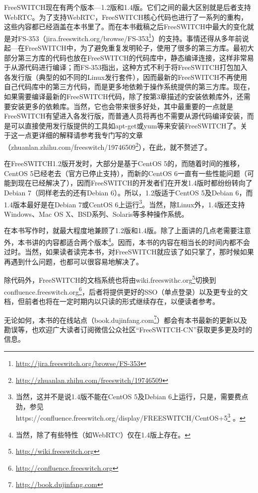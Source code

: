 \documentclass[$if(fontsize)$$fontsize$,$endif$$if(lang)$$lang$,$endif$CJKutf8]{$documentclass$}
\renewcommand{\href}[2]{#2\footnote{\url{#1}}}
\begin{document}
FreeSWITCH现在有两个版本---1.2版和1.4版。它们之间的最大区别就是后者支持WebRTC。为了支持WebRTC，FreeSWITCH核心代码也进行了一系列的重构，这些内容都已经涵盖在本书里了。而在本书截稿之后FreeSWITCH中最大的变化就是对FS-353（\href{http://jira.freeswitch.org/browse/FS-353}{jira.freeswitch.org/browse/FS-353}）的支持。事情还得从多年前说起---在FreeSWITCH中，为了避免重复发明轮子，使用了很多的第三方库。最初大部分第三方库的代码也放在FreeSWITCH的代码库中，静态编译连接，这样非常易于从源代码进行编译；而FS-353指出，这种方式不利于将FreeSWITCH打包加入各发行版（典型的如不同的Linux发行套件），因而最新的FreeSWITCH不再使用自己代码库中的第三方代码，而是更多地依赖于操作系统提供的第三方库。现在，如果需要编译最新的FreeSWITCH代码，除了按第3章描述的安装依赖库外，还需要安装更多的依赖库。当然，它也会带来很多好处，其中最重要的一点就是FreeSWITCH有望进入各发行版，而普通人员将再也不需要从源代码编译安装，而是可以直接使用发行版提供的工具如apt-get或yum等来安装FreeSWITCH了。关于这一点更详细的解释请参考我专门写的文章（\href{http://zhuanlan.zhihu.com/freeswitch/19746509}{zhuanlan.zhihu.com/freeswitch/19746509}），在此，就不赘述了。

在FreeSWITCH1.2版开发时，大部分是基于CentOS 5的，而随着时间的推移，CentOS 5已经老去（官方已停止支持），而新的CentOS 6一直有一些性能问题（可能到现在已经解决了），因而FreeSWITCH的开发者们在开发1.4版时都纷纷转向了Debian 7（同样老去的还有Debian 6）。所以，1.2版适于CentOS 5及Debian 6，而1.4版本最好是在Debian 7或CentOS 6上运行\footnote{当然，这并不是说1.4版不能在CentOS 5及Debian 6上运行，只是，需要费点劲，参见\href{https://confluence.freeswitch.org/display/FREESWITCH/CentOS+5}{https://confluence.freeswitch.org/display/FREESWITCH/CentOS+5} 。}。当然，除Linux外，1.4版还支持Windows、Mac OS X、BSD系列、Solaris等多种操作系统。

在本书写作时，就最大程度地兼顾了1.2版和1.4版。除了上面讲的几点老需要注意外，本书讲的内容都适合两个版本\footnote{当然，除了有些特性（如WebRTC）仅在1.4版上存在。}。因而，本书的内容在相当长的时间内都不会过时。当然，如果读者读完本书，对FreeSWITCH就应该了如只掌了，那时候如果再遇到什么问题，也都可以很容易地解决了。

除代码外，FreeSWITCH的文档系统也将由\href{http://wiki.freeswitch.org}{wiki.freeswithc.org}切换到\href{http://confluence.freeswitch.org}{confluence.freeswitch.org}，后者将提供更好的SSO（单点登录）以及更专业的文档，但前者也将在一定时期内以只读的形式继续存在，以便读者参考。

无论如何，本书的在线站点（\href{http://book.dujinfang.com}{book.dujinfang.com}）都会有本书最新的更新以及勘误等，也欢迎广大读者订阅微信公众社区“FreeSWITCH-CN”获取更多更及时的信息。
\end{document}
